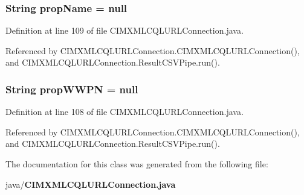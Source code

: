 \subsubsection[{prop\+Name}]{\setlength{\rightskip}{0pt plus 5cm}String prop\+Name = null\hspace{0.3cm}{\ttfamily [protected]}}\label{classorg_1_1smallfoot_1_1parser_1_1cimcql_1_1CIMXMLCQLURLConnection_a49fa47bfe76993bf911116857492e2ca}


Definition at line 109 of file C\+I\+M\+X\+M\+L\+C\+Q\+L\+U\+R\+L\+Connection.\+java.



Referenced by C\+I\+M\+X\+M\+L\+C\+Q\+L\+U\+R\+L\+Connection.\+C\+I\+M\+X\+M\+L\+C\+Q\+L\+U\+R\+L\+Connection(), and C\+I\+M\+X\+M\+L\+C\+Q\+L\+U\+R\+L\+Connection.\+Result\+C\+S\+V\+Pipe.\+run().

\subsubsection[{prop\+W\+W\+P\+N}]{\setlength{\rightskip}{0pt plus 5cm}String prop\+W\+W\+P\+N = null\hspace{0.3cm}{\ttfamily [protected]}}\label{classorg_1_1smallfoot_1_1parser_1_1cimcql_1_1CIMXMLCQLURLConnection_adf887561fc9bb90802d364643c222af6}


Definition at line 108 of file C\+I\+M\+X\+M\+L\+C\+Q\+L\+U\+R\+L\+Connection.\+java.



Referenced by C\+I\+M\+X\+M\+L\+C\+Q\+L\+U\+R\+L\+Connection.\+C\+I\+M\+X\+M\+L\+C\+Q\+L\+U\+R\+L\+Connection(), and C\+I\+M\+X\+M\+L\+C\+Q\+L\+U\+R\+L\+Connection.\+Result\+C\+S\+V\+Pipe.\+run().



The documentation for this class was generated from the following file\+:\begin{DoxyCompactItemize}
\item 
java/{\bf C\+I\+M\+X\+M\+L\+C\+Q\+L\+U\+R\+L\+Connection.\+java}\end{DoxyCompactItemize}

